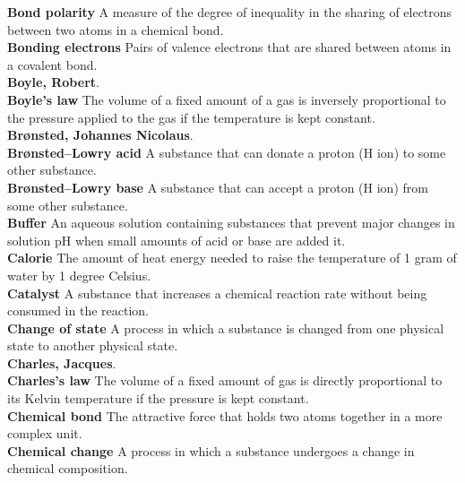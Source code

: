 \documentclass[10pt, roman]{article}
\begin{document}
\begin{minipage}[c]{0.30\textwidth}
\textbf{Bond polarity} A measure of the degree of inequality in the sharing of electrons between two atoms in a chemical bond. \\
\textbf{Bonding electrons} Pairs of valence electrons that are shared between atoms in a covalent bond. \\
\textbf{Boyle, Robert}. \\
\textbf{Boyle’s law} The volume of a fixed amount of a gas is inversely proportional to the pressure applied to the gas if the temperature is kept constant. \\
\textbf{Brønsted, Johannes Nicolaus}. \\
\textbf{Brønsted–Lowry acid} A substance that can donate a proton (H ion) to some other substance. \\
\textbf{Brønsted–Lowry base} A substance that can accept a proton (H ion) from some other substance. \\
\textbf{Buffer} An aqueous solution containing substances that prevent major changes in solution pH when small amounts of acid or base are added it. \\
\textbf{Calorie} The amount of heat energy needed to raise the temperature of 1 gram of water by 1 degree Celsius. \\
\textbf{Catalyst} A substance that increases a chemical reaction rate without being consumed in the reaction. \\
\textbf{Change of state} A process in which a substance is changed from one physical state to another physical state. \\
\textbf{Charles, Jacques}. \\
\textbf{Charles’s law} The volume of a fixed amount of gas is directly proportional to its Kelvin temperature if the pressure is kept constant. \\
\textbf{Chemical bond} The attractive force that holds two atoms together in a more complex unit. \\
\textbf{Chemical change} A process in which a substance undergoes a change in chemical composition. \\
\end{minipage}%
\newpage
\end{document}
